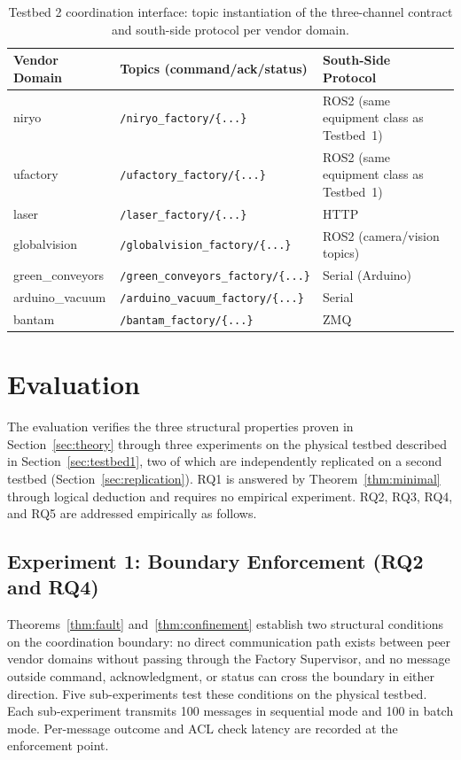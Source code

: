 \documentclass[a4paper,fleqn]{cas-dc}
\begin{document}
\begin{table}[h]
\centering
\caption{Testbed 2 coordination interface: topic instantiation of the three-channel contract and south-side protocol per vendor domain.}
\label{tab:testbed2_coord}
\begin{tabular}{lll}
\toprule
\textbf{Vendor Domain} & \textbf{Topics (command/ack/status)} & \textbf{South-Side Protocol} \\
\midrule
niryo            & \texttt{/niryo\_factory/\{...\}}            & ROS2 (same equipment class as Testbed~1) \\
ufactory         & \texttt{/ufactory\_factory/\{...\}}         & ROS2 (same equipment class as Testbed~1) \\
laser            & \texttt{/laser\_factory/\{...\}}            & HTTP \\
globalvision     & \texttt{/globalvision\_factory/\{...\}}     & ROS2 (camera/vision topics) \\
green\_conveyors & \texttt{/green\_conveyors\_factory/\{...\}} & Serial (Arduino) \\
arduino\_vacuum  & \texttt{/arduino\_vacuum\_factory/\{...\}}  & Serial \\
bantam           & \texttt{/bantam\_factory/\{...\}}           & ZMQ \\
\bottomrule
\end{tabular}
\end{table}


\section{Evaluation}
\label{sec:evaluation}

The evaluation verifies the three structural properties proven in Section~\ref{sec:theory} through three experiments on the physical testbed described in Section~\ref{sec:testbed1}, two of which are independently replicated on a second testbed (Section~\ref{sec:replication}). RQ1 is answered by Theorem~\ref{thm:minimal} through logical deduction and requires no empirical experiment. RQ2, RQ3, RQ4, and RQ5 are addressed empirically as follows.

\subsection{Experiment 1: Boundary Enforcement (RQ2 and RQ4)}

Theorems~\ref{thm:fault} and~\ref{thm:confinement} establish two structural conditions on the coordination boundary: no direct communication path exists between peer vendor domains without passing through the Factory Supervisor, and no message outside command, acknowledgment, or status can cross the boundary in either direction. Five sub-experiments test these conditions on the physical testbed. Each sub-experiment transmits 100 messages in sequential mode and 100 in batch mode. Per-message outcome and ACL check latency are recorded at the enforcement point.
\end{document}
